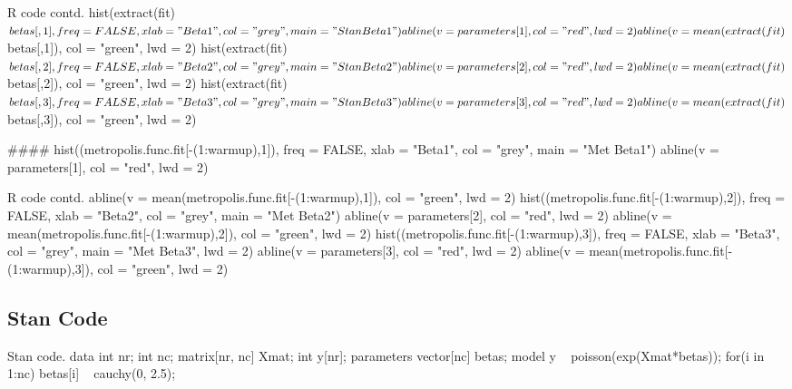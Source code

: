 \documentclass{article}
\begin{document}
\begin{sexylisting}{R code contd.}
hist(extract(fit)$betas[,1], 
      freq = FALSE, 
      xlab = "Beta1",
      col = "grey",
      main = "Stan Beta 1")
abline(v = parameters[1], 
       col = "red",
       lwd = 2)
abline(v = mean(extract(fit)$betas[,1]),
       col = "green",
       lwd = 2)
hist(extract(fit)$betas[,2], 
     freq = FALSE, 
     xlab = "Beta2",
     col = "grey",
     main = "Stan Beta 2")
abline(v = parameters[2], 
       col = "red",
       lwd = 2)
abline(v = mean(extract(fit)$betas[,2]),
       col = "green",
       lwd = 2)
hist(extract(fit)$betas[,3], 
     freq = FALSE, 
     xlab = "Beta3",
     col = "grey",
     main = "Stan Beta 3")
abline(v = parameters[3], 
       col = "red",
       lwd = 2)
abline(v = mean(extract(fit)$betas[,3]),
       col = "green",
       lwd = 2)

####
hist((metropolis.func.fit[-(1:warmup),1]), 
     freq = FALSE, 
     xlab = "Beta1",
     col = "grey",
     main = "Met Beta1")
abline(v = parameters[1], 
       col = "red",
       lwd = 2)
       \end{sexylisting}
\begin{sexylisting}{R code contd.}
abline(v = mean(metropolis.func.fit[-(1:warmup),1]), 
       col = "green",
       lwd = 2)
hist((metropolis.func.fit[-(1:warmup),2]), 
     freq = FALSE,
     xlab = "Beta2",
     col = "grey",
     main = "Met Beta2")
abline(v = parameters[2], 
       col = "red",
       lwd = 2)
abline(v = mean(metropolis.func.fit[-(1:warmup),2]), 
       col = "green",
       lwd = 2)
hist((metropolis.func.fit[-(1:warmup),3]), 
     freq = FALSE,
     xlab = "Beta3",
     col = "grey",
     main = "Met Beta3",
     lwd = 2)
abline(v = parameters[3], 
       col = "red",
       lwd = 2)
abline(v = mean(metropolis.func.fit[-(1:warmup),3]), 
       col = "green",
       lwd = 2)
\end{sexylisting}
\subsection{Stan Code}
\begin{sexylisting}{Stan code.}
data{
int nr; 
int nc;
matrix[nr, nc] Xmat; 
int y[nr];
} 
parameters{
vector[nc] betas; 
}
model{
 y ~ poisson(exp(Xmat*betas));
  for(i in 1:nc){
    betas[i] ~ cauchy(0, 2.5);
  }
}
\end{sexylisting}
\end{document}
